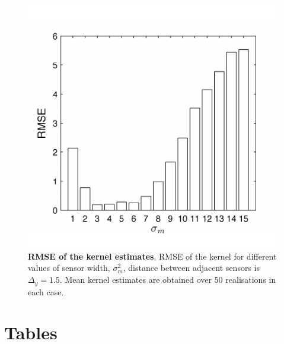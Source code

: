 \documentclass[12pt]{iopart}
\begin{document}
\begin{figure}[!ht]
\begin{center}
\includegraphics{./Graph/pdf/RMSESensor.pdf}
\end{center}
\caption{{\bf RMSE of the kernel estimates}. RMSE of the kernel for different values of sensor width, $\sigma^2_m$, distance between adjacent sensors is $\Delta_y=1.5$. Mean kernel estimates are obtained over 50 realisations in each case.}
\label{fig:Figure13}
\end{figure}
\section*{Tables}
\end{document}
